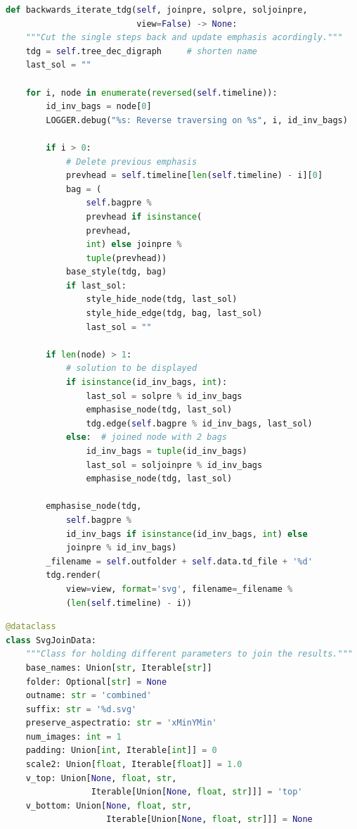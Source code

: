 \documentclass[a4paper, 12pt, bibliography=totoc]{scrartcl}
\begin{document}
\begin{lstlisting}[language={Python}, caption={backwards\_iterate\_tdg}, label={lst:backward-iterate}]
def backwards_iterate_tdg(self, joinpre, solpre, soljoinpre,
                          view=False) -> None:
	"""Cut the single steps back and update emphasis acordingly."""
	tdg = self.tree_dec_digraph     # shorten name
	last_sol = ""
	
	for i, node in enumerate(reversed(self.timeline)):
		id_inv_bags = node[0]
		LOGGER.debug("%s: Reverse traversing on %s", i, id_inv_bags)
		
		if i > 0:
			# Delete previous emphasis
			prevhead = self.timeline[len(self.timeline) - i][0]
			bag = (
				self.bagpre %
				prevhead if isinstance(
				prevhead,
				int) else joinpre %
				tuple(prevhead))
			base_style(tdg, bag)
			if last_sol:
				style_hide_node(tdg, last_sol)
				style_hide_edge(tdg, bag, last_sol)
				last_sol = ""
		
		if len(node) > 1:
			# solution to be displayed
			if isinstance(id_inv_bags, int):
				last_sol = solpre % id_inv_bags
				emphasise_node(tdg, last_sol)
				tdg.edge(self.bagpre % id_inv_bags, last_sol)
			else:  # joined node with 2 bags
				id_inv_bags = tuple(id_inv_bags)
				last_sol = soljoinpre % id_inv_bags
				emphasise_node(tdg, last_sol)
			
		emphasise_node(tdg,
			self.bagpre %
			id_inv_bags if isinstance(id_inv_bags, int) else 
			joinpre % id_inv_bags)
		_filename = self.outfolder + self.data.td_file + '%d'
		tdg.render(
			view=view, format='svg', filename=_filename %
			(len(self.timeline) - i))

\end{lstlisting}

\begin{lstlisting}[language={Python}, caption={SvgJoinData}, label={lst:svgjoindata}]
@dataclass
class SvgJoinData:
	"""Class for holding different parameters to join the results."""
	base_names: Union[str, Iterable[str]]
	folder: Optional[str] = None
	outname: str = 'combined'
	suffix: str = '%d.svg'
	preserve_aspectratio: str = 'xMinYMin'
	num_images: int = 1
	padding: Union[int, Iterable[int]] = 0
	scale2: Union[float, Iterable[float]] = 1.0
	v_top: Union[None, float, str, 
	             Iterable[Union[None, float, str]]] = 'top'
	v_bottom: Union[None, float, str, 
	                Iterable[Union[None, float, str]]] = None
\end{lstlisting}

\end{document}
